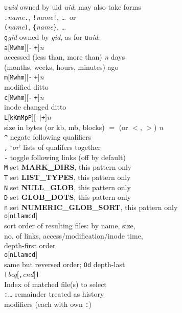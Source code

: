 \documentclass{article}
\newcommand\B[1]{\textbf{#1}}
\newcommand\I[1]{\textsl{#1}}
\newcommand\T[1]{\texttt{#1}}
\newcommand\Lsq{\ensuremath{\boldsymbol{[}}}
\newcommand\Rsq{\ensuremath{\boldsymbol{]}}}
\begin{document}
\begin{multicols}{3}
\begin{tabbing}
\T{u}\I{uid}   \> owned by uid \I{uid}; may also take forms \\
               \> \T{.}\I{name}\T{.}, \T{!}\I{name}\T{!}, \dots\ or \\
               \> \T{(}\I{name}\T{)}, \verb!{!\I{name}\verb!}!, \dots \\
\T{g}\I{gid}   \> owned by \I{gid}, as for \T{u}\I{uid}. \\
\T{a}\Lsq\T{Mwhm}\Rsq\Lsq\T{-}$\mid$\T{+}\Rsq\I{n} \\
               \> accessed  (less than, more than) \I{n} days \\
               \> (months, weeks, hours, minutes) ago \\
\T{m}\Lsq\T{Mwhm}\Rsq\Lsq\T{-}$\mid$\T{+}\Rsq\I{n} \\
               \> modified ditto \\
\T{c}\Lsq\T{Mwhm}\Rsq\Lsq\T{-}$\mid$\T{+}\Rsq\I{n} \\
               \> inode changed ditto \\
\T{L}\Lsq\T{kKmMpP}\Rsq\Lsq\T{-}$\mid$\T{+}\Rsq\I{n} \\
               \> size in bytes (or kb, mb, blocks) $=$ (or $<$, $>$) \I{n} \\
\verb!^!       \> negate following qualifiers \\
\verb!,!       \> `\I{or}' lists of qualifers together \\
\verb!-!       \> toggle following links (off by default) \\
\T{M}          \> set \B{MARK\_DIRS}, this pattern only \\
\T{T}          \> set \B{LIST\_TYPES}, this pattern only \\
\T{N}          \> set \B{NULL\_GLOB}, this pattern only \\
\T{D}          \> set \B{GLOB\_DOTS}, this pattern only \\
\T{n}          \> set \B{NUMERIC\_GLOB\_SORT}, this pattern only \\
\T{o}\Lsq\T{nLlamcd}\Rsq \\
               \> sort order of resulting files: by name, size, \\
               \> no. of links, access/modification/inode time, \\
               \> depth-first order \\
\T{o}\Lsq\T{nLlamcd}\Rsq \\
               \> same but reversed order; \verb!Od! depth-last \\
\verb![!\I{beg}\Lsq\verb!,!\I{end}\Rsq\verb!]! \\
               \> Index of matched file(s) to select \\
\verb!:!\dots  \> remainder treated as history \\
               \> modifiers (each with own \verb!:!)\\
\end{tabbing}
\end{multicols}
\end{document}
